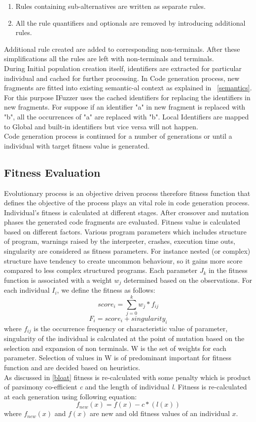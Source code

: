 \documentclass{acm_proc_article-sp}
\begin{document}
\begin{enumerate}
\item Rules containing sub-alternatives are written as separate rules.
\item All the rule quantifiers and optionals are removed by introducing additional rules.
\end{enumerate}
Additional rule created are added to corresponding non-terminals. After these simplifications all the rules are left with non-terminals and terminals.\\
\indent During Initial population creation itself, identifiers are extracted for particular individual and cached for further processing. In Code generation process, new fragments are fitted into existing semantic-al context as explained in ~\autoref{semantics}. For this purpose IFuzzer uses the cached identifiers for replacing the identifiers in new fragments. For suppose if an identifier "a" in new fragment is replaced with "b", all the occurrences of "a" are replaced with "b". Local Identifiers are mapped to Global and built-in identifiers but vice versa will not happen.\\
Code generation process is continued for a number of generations or until a individual with target fitness value is generated. 

\subsection{Fitness Evaluation} \label{fitness}
Evolutionary process is an objective driven process therefore fitness function that defines the objective of the process plays an vital role in code generation process. Individual's fitness is calculated at different stages. After crossover and mutation phases the generated code fragments are evaluated. Fitness value is calculated based on different factors. Various program parameters which includes structure of program, warnings raised by the interpreter, crashes, execution time outs, singularity are considered as fitness parameters. For instance nested (or complex) structure have tendency to create uncommon behaviour, so it gains more score compared to less complex structured programs. Each parameter $J_{k}$ in the fitness function is associated with a weight $w_{j}$ determined based on the observations. For each individual $I_{i}$, we define the fitness as follows:
\[score_{i} = \sum_{j=0}^{k} w_{j} * f_{ij} \]
\[F_{i} = score_{i} + singularity_{i}  \]
where $f_{ij}$ is the occurrence frequency or characteristic value of parameter, singularity of the individual is calculated at the point of mutation based on the selection and expansion of non terminals. W is the set of weights for each parameter. Selection of values in W is of predominant important for fitness function and are decided based on heuristics.\\
\indent As discussed in \autoref{bloat} fitness is re-calculated with some penalty which is product of parsimony co-efficient \textit{c} and the length of individual \textit{l}. Fitness is re-calculated at each generation using following equation:
\[f_{new}(x) = f(x) - c*(l(x))  \]
where $f_{new}(x)$ and $f(x)$ are new and old fitness values of an individual $x$.
\end{document}
